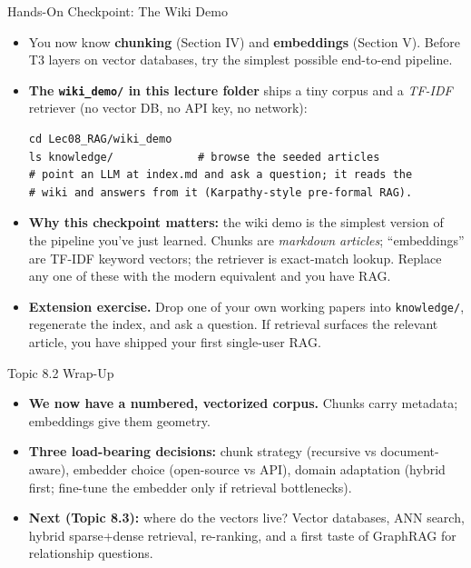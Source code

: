 \begin{frame}[fragile]{Hands-On Checkpoint: The Wiki Demo}
\begin{itemize}
\item You now know \textbf{chunking} (Section IV) and \textbf{embeddings} (Section V). Before T3 layers on vector databases, try the simplest possible end-to-end pipeline.

\medskip
\item \textbf{The \texttt{wiki\_demo/} in this lecture folder} ships a tiny corpus and a \emph{TF-IDF} retriever (no vector DB, no API key, no network):
\begin{lstlisting}[basicstyle=\ttfamily\scriptsize, numbers=none]
cd Lec08_RAG/wiki_demo
ls knowledge/             # browse the seeded articles
# point an LLM at index.md and ask a question; it reads the
# wiki and answers from it (Karpathy-style pre-formal RAG).
\end{lstlisting}

\medskip
\item \textbf{Why this checkpoint matters:} the wiki demo is the simplest version of the pipeline you've just learned. Chunks are \emph{markdown articles}; ``embeddings'' are TF-IDF keyword vectors; the retriever is exact-match lookup. Replace any one of these with the modern equivalent and you have RAG.

\medskip
\item \textbf{Extension exercise.} Drop one of your own working papers into \texttt{knowledge/}, regenerate the index, and ask a question. If retrieval surfaces the relevant article, you have shipped your first single-user RAG.
\end{itemize}
\end{frame}

\begin{frame}{Topic 8.2 Wrap-Up}
\begin{itemize}
\item \textbf{We now have a numbered, vectorized corpus.} Chunks carry metadata; embeddings give them geometry.

\medskip
\item \textbf{Three load-bearing decisions:} chunk strategy (recursive vs document-aware), embedder choice (open-source vs API), domain adaptation (hybrid first; fine-tune the embedder only if retrieval bottlenecks).

\medskip
\item \textbf{Next (Topic 8.3):} where do the vectors live? Vector databases, ANN search, hybrid sparse+dense retrieval, re-ranking, and a first taste of GraphRAG for relationship questions.
\end{itemize}
\end{frame}

